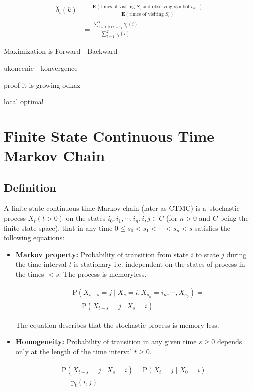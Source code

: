 \documentclass[thesis=M,english]{FITthesis}[2012/10/20]
\begin{document}
\begin{equation}
\begin{aligned}
\hat b_{i}(k) &= \frac{\mathbf{E}(\text{times of visiting $S_i$ and observing symbol $v_k$ })}
				   {\mathbf{E}(\text{times of visiting $S_i$})} \\
			  &= \frac{\sum\limits_{t=1, \text{if } O_t = v_k  }^{T} \gamma_t(i)}{\sum\limits_{t=1}^{T} \gamma_t(i) } 
\end{aligned}
\end{equation}



Maximization is Forward - Backward

ukoncenie - konvergence

proof it is growing {odkaz}

local optima!


\chapter{Finite State Continuous Time Markov Chain} 

\section{Definition}
A finite state continuous time Markov chain (later as CTMC) is a~stochastic process $X_t (t > 0)$ on the states $i_0, i_1, \cdots, i_n, i, j \in C$ (for $n>0$ and $C$ being the finite state space), that in any time $0 \leq s_0 < s_1 < \cdots < s_n < s$ satisfies the following equations: 
\begin{itemize}
\item \textbf{Markov property:} Probability of transition from state $i$ to state $j$ during the time interval $t$ is stationary i.e. independent on the states of process in the times $< s$. The process is memoryless.    
    
\begin{equation}
\begin{aligned}
& \mathrm{P}( X_{t+s} = j \mid X_s = i, X_{s_n} = i_n, \cdots , X_{s_0} ) = \\ 
& = \mathrm{P}( X_{t+s} = j \mid X_s = i )
\end{aligned}
\end{equation}

The equation describes that the stochastic process is memory-less.

\item \textbf{Homogeneity:} Probability of transition in any given time $s \geq 0$ depends only at the length of the time interval $t \geq 0$. 

\begin{equation}
\begin{aligned}
& \mathrm{P}( X_{t+s} = j \mid X_s = i ) = \mathrm{P}( X_t = j \mid X_0 = i ) = \\
& = \mathrm{p_t}(i,j)
\end{aligned}
\end{equation}

\end{itemize}
\end{document}
